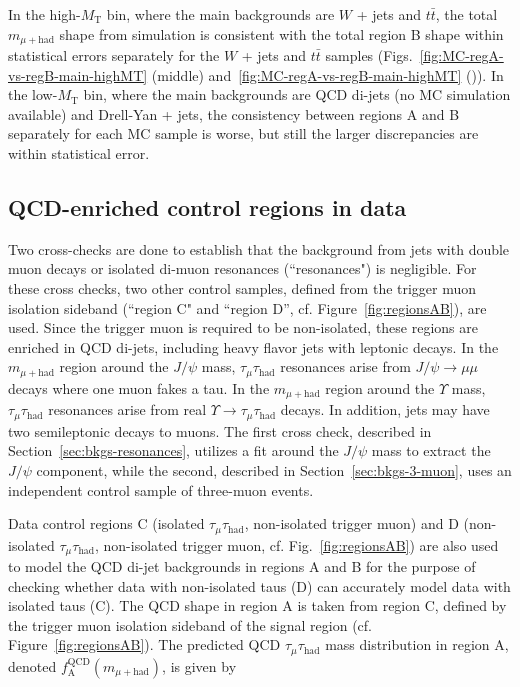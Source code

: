 In the high-$M_{\text{T}}$ bin, where the main backgrounds are $W$ + jets and $t\bar{t}$, the total $m_{\mu+\text{had}}$ shape from simulation is consistent with the total region B shape within statistical errors separately for the $W$ + jets and $t\bar{t}$ samples (Figs.~\ref{fig:MC-regA-vs-regB-main-highMT} (middle) and~\ref{fig:MC-regA-vs-regB-main-highMT} (\cmsRight)).  In the low-$M_{\text{T}}$ bin, where the main backgrounds are QCD di-jets (no MC simulation available) and Drell-Yan + jets, the consistency between regions A and B separately for each MC sample is worse, but still the larger discrepancies are within statistical error.

\subsection{QCD-enriched control regions in data\label{sec:bkgs-qcd-control}}

Two cross-checks are done to establish that the background from jets with double muon decays or isolated di-muon resonances (``resonances") is negligible.  For these cross checks, two other control samples, defined from the trigger muon isolation sideband (``region C" and ``region D'', cf. Figure~\ref{fig:regionsAB}), are used.  Since the trigger muon is required to be non-isolated, these regions are enriched in QCD di-jets, including heavy flavor jets with leptonic decays.  In the $m_{\mu+\text{had}}$ region around the $J\slash\psi$ mass, $\tau_{\mu}\tau_{\text{had}}$ resonances arise from $J\slash\psi\rightarrow\mu\mu$ decays where one muon fakes a tau.  In the $m_{\mu+\text{had}}$ region around the $\Upsilon$ mass, $\tau_{\mu}\tau_{\text{had}}$ resonances arise from real $\Upsilon\rightarrow\tau_{\mu}\tau_{\text{had}}$ decays.  In addition, jets may have two semileptonic decays to muons.  The first cross check, described in Section~\ref{sec:bkgs-resonances}, utilizes a fit around the $J\slash\psi$ mass to extract the $J\slash\psi$ component, while the second, described in Section~\ref{sec:bkgs-3-muon}, uses an independent control sample of three-muon events.

Data control regions C (isolated $\tau_{\mu}\tau_{\text{had}}$, non-isolated trigger muon) and D (non-isolated $\tau_{\mu}\tau_{\text{had}}$, non-isolated trigger muon, cf. Fig.~\ref{fig:regionsAB}) are also used to model the QCD di-jet backgrounds in regions A and B for the purpose of checking whether data with non-isolated taus (D) can accurately model data with isolated taus (C). The QCD shape in region A is taken from region C, defined by the trigger muon isolation sideband of the signal region (cf. Figure~\ref{fig:regionsAB}).  The predicted QCD $\tau_{\mu}\tau_{\text{had}}$ mass distribution in region A, denoted $f_{\text{A}}^{\text{QCD}}(m_{\mu+\text{had}})$, is given by

